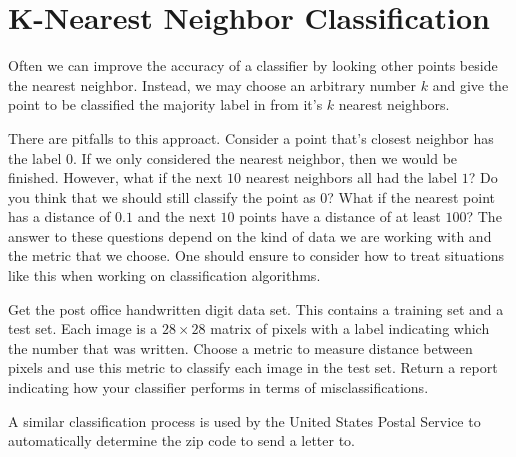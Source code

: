 \section*{K-Nearest Neighbor Classification}

Often we can improve the accuracy of a classifier by looking other points beside the nearest neighbor.  Instead, we may choose an arbitrary number $k$ and give the point to be classified the majority label in from it's $k$ nearest neighbors. 

There are pitfalls to this approact.  Consider a point that's closest neighbor has the label $0$.  If we only considered the nearest neighbor, then we would be finished.  However, what if the next $10$ nearest neighbors all had the label $1$?  Do you think that we should still classify the point as $0$?  What if the nearest point has a distance of $0.1$ and the next $10$ points have a distance of at least $100$?  The answer to these questions depend on the kind of data we are working with and the metric that we choose.  One should ensure to consider how to treat situations like this when working on classification algorithms.

\begin{problem}

Get the post office handwritten digit data set.  This contains a training set and a test set.  Each image is a $28 \times 28$ matrix of pixels with a label indicating which the number that was written.  Choose a metric to measure distance between pixels and use this metric to classify each image in the test set.  Return a report indicating how your classifier performs in terms of misclassifications.

A similar classification process is used by the United States Postal Service to automatically determine the zip code to send a letter to.

\end{problem}





















































